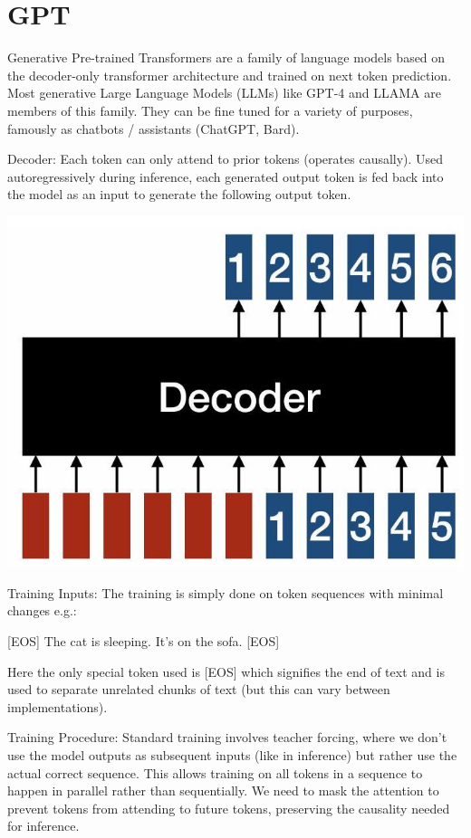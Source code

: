 \documentclass[10pt]{article}
\begin{document}
\section*{GPT}
Generative Pre-trained Transformers are a family of language models based on the decoder-only transformer architecture and trained on next token prediction. Most generative Large Language Models (LLMs) like GPT-4 and LLAMA are members of this family. They can be fine tuned for a variety of purposes, famously as chatbots / assistants (ChatGPT, Bard).

Decoder: Each token can only attend to prior tokens (operates causally). Used autoregressively during inference, each generated output token is fed back into the model as an input to generate the following output token.

\begin{center}
\includegraphics[max width=\textwidth]{2024_01_08_7c14f4867d7823fc5a52g-07}
\end{center}

Training Inputs: The training is simply done on token sequences with minimal changes e.g.:

[EOS] The cat is sleeping. It's on the sofa. [EOS]

Here the only special token used is [EOS] which signifies the end of text and is used to separate unrelated chunks of text (but this can vary between implementations).

Training Procedure: Standard training involves teacher forcing, where we don't use the model outputs as subsequent inputs (like in inference) but rather use the actual correct sequence. This allows training on all tokens in a sequence to happen in parallel rather than sequentially. We need to mask the attention to prevent tokens from attending to future tokens, preserving the causality needed for inference.
\end{document}
